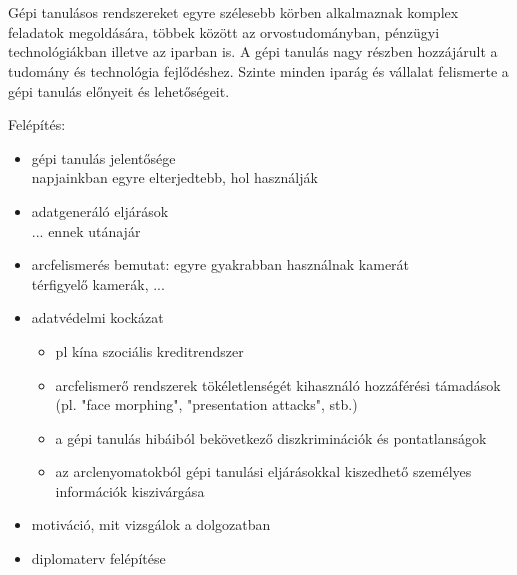 \chapter{\bevezetes}

Gépi tanulásos rendszereket egyre szélesebb körben alkalmaznak komplex feladatok megoldására, többek között az orvostudományban, pénzügyi technológiákban illetve az iparban is. A gépi tanulás nagy részben hozzájárult a tudomány és technológia fejlődéshez. Szinte minden iparág és vállalat felismerte a gépi tanulás előnyeit és lehetőségeit.







\newpage
Felépítés:
\begin{itemize}
	\item gépi tanulás jelentősége \\ napjainkban egyre elterjedtebb, hol használják
	\item adatgeneráló eljárások \\ ... ennek utánajár
	\item arcfelismerés bemutat: egyre gyakrabban használnak kamerát \\ térfigyelő kamerák, ...
	\item adatvédelmi kockázat
	\begin{itemize}
		\item pl kína szociális kreditrendszer
		\item  arcfelismerő rendszerek tökéletlenségét kihasználó hozzáférési támadások (pl. "face morphing", "presentation attacks", stb.)
		\item a gépi tanulás hibáiból bekövetkező diszkriminációk és pontatlanságok
		\item az arclenyomatokból gépi tanulási eljárásokkal kiszedhető személyes információk kiszivárgása
	\end{itemize}
	\item motiváció, mit vizsgálok a dolgozatban
	\item diplomaterv felépítése
\end{itemize}
